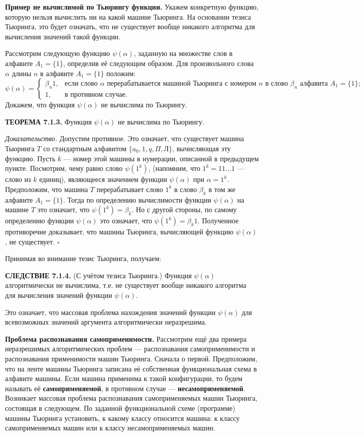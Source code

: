 \documentclass[a4paper,12pt]{article}
\begin{document}
\textbf{Пример не вычислимой по Тьюрингу функции.} Укажем конкретную функцию, которую нельзя вычислить ни на какой машине Тьюринга. На основании тезиса Тьюринга, это будет означать, что не существует вообще никакого алгоритма для вычисления значений такой функции.

Рассмотрим следующую функцию \(\psi(\alpha)\), заданную на множестве слов в алфавите \(A_1 = \{1\}\), определив её следующим образом. Для произвольного слова \(\alpha\) длины \(n\) в алфавите \(A_1 = \{1\}\) положим:
\[
\psi(\alpha) = 
\begin{cases}
\beta_n 1, & \text{если слово } \alpha \text{ перерабатывается машиной Тьюринга с номером } n \text{ в слово } \beta_n \text{ алфавита } A_1 = \{1\}; \\
1, & \text{в противном случае}.
\end{cases}
\]
Докажем, что функция \(\psi(\alpha)\) не вычислима по Тьюрингу.

\textbf{ТЕОРЕМА 7.1.3.} Функция \(\psi(\alpha)\) не вычислима по Тьюрингу.

\textit{Доказательство.} Допустим противное. Это означает, что существует машина Тьюринга \(T\) со стандартным алфавитом \(\{a_0, 1, q, \Pi, \text{Л}\}\), вычисляющая эту функцию. Пусть \(k\) --- номер этой машины в нумерации, описанной в предыдущем пункте. Посмотрим, чему равно слово \(\psi(1^k)\), (напомним, что \(1^k = 11\dots1\) --- слово из \(k\) единиц), являющееся значением функции \(\psi(\alpha)\) при \(\alpha = 1^k\). Предположим, что машина \(T\) перерабатывает слово \(1^k\) в слово \(\beta_k\) в том же алфавите \(A_1 = \{1\}\). Тогда по определению вычислимости функции \(\psi(\alpha)\) на машине \(T\) это означает, что \(\psi(1^k) = \beta_k\). Но с другой стороны, по самому определению функции \(\psi(\alpha)\) это означает, что \(\psi(1^k) = \beta_k 1\). Полученное противоречие доказывает, что машины Тьюринга, вычисляющей функцию \(\psi(\alpha)\), не существует. \(\square\)

Принимая во внимание тезис Тьюринга, получаем:

\textbf{СЛЕДСТВИЕ 7.1.4.} (С учётом тезиса Тьюринга.) Функция \(\psi(\alpha)\) алгоритмически не вычислима, т.е. не существует вообще никакого алгоритма для вычисления значений функции \(\psi(\alpha)\).

Это означает, что массовая проблема нахождения значений функции \(\psi(\alpha)\) для всевозможных значений аргумента алгоритмически неразрешима.

\textbf{Проблема распознавания самоприменимости.} Рассмотрим ещё два примера неразрешимых алгоритмических проблем --- распознавания самоприменимости и распознавания применимости машин Тьюринга. Сначала о первой. Предположим, что на ленте машины Тьюринга записана её собственная функциональная схема в алфавите машины. Если машина применима к такой конфигурации, то будем называть её \textbf{самоприменяемой}, в противном случае --- \textbf{несамоприменяемой}. Возникает массовая проблема распознавания самоприменяемых машин Тьюринга, состоящая в следующем. По заданной функциональной схеме (программе) машины Тьюринга установить, к какому классу относится машина: к классу самоприменяемых машин или к классу несамоприменяемых машин.
\end{document}
